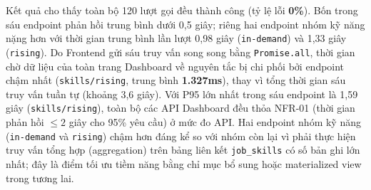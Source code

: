 \begin{table}[H]
\caption{Thời gian phản hồi thực đo của sáu API Dashboard thị trường (tháng 07/2026)}
\label{tab:api_performance_dashboard}
\begin{center}
\end{center}
\end{table}

Kết quả cho thấy toàn bộ 120 lượt gọi đều thành công (tỷ lệ lỗi \textbf{0\%}). Bốn trong sáu endpoint phản hồi trung bình dưới 0,5 giây; riêng hai endpoint nhóm kỹ năng nặng hơn với thời gian trung bình lần lượt 0,98 giây (\texttt{in-demand}) và 1,33 giây (\texttt{rising}). Do Frontend gửi sáu truy vấn song song bằng \texttt{Promise.all}, thời gian chờ dữ liệu của toàn trang Dashboard về nguyên tắc bị chi phối bởi endpoint chậm nhất (\texttt{skills/rising}, trung bình \textbf{1.327ms}), thay vì tổng thời gian sáu truy vấn tuần tự (khoảng 3,6 giây). Với P95 lớn nhất trong sáu endpoint là 1,59 giây (\texttt{skills/rising}), toàn bộ các API Dashboard đều thỏa NFR-01 (thời gian phản hồi $\le 2$ giây cho 95\% yêu cầu) ở mức đo API. Hai endpoint nhóm kỹ năng (\texttt{in-demand} và \texttt{rising}) chậm hơn đáng kể so với nhóm còn lại vì phải thực hiện truy vấn tổng hợp (aggregation) trên bảng liên kết \texttt{job\_skills} có số bản ghi lớn nhất; đây là điểm tối ưu tiềm năng bằng chỉ mục bổ sung hoặc materialized view trong tương lai.

